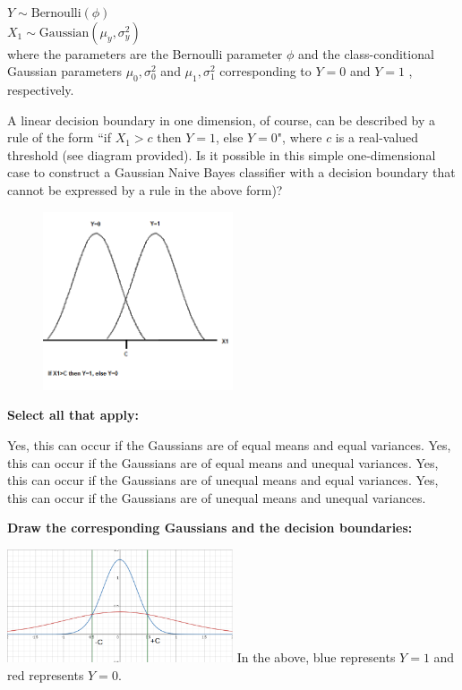 \documentclass[11pt,addpoints,answers]{exam}
\begin{document}
\begin{questions}
    $Y \sim \text{Bernoulli}(\phi)$\\
    $X_1 \sim \text{Gaussian}(\mu_y, \sigma^2_y)$\\
    where the parameters are the Bernoulli parameter $\phi$  and the class-conditional Gaussian parameters $\mu_0, \sigma^2_0$ and $\mu_1, \sigma^2_1$   corresponding to $Y=0$ and $Y=1$ , respectively.

    A linear decision boundary in one dimension, of course, can be described by a rule of the form ``if $X_1>c$  then $Y=1$, else $Y=0$", where $c$ is a real-valued threshold (see diagram provided). Is it possible in this simple one-dimensional case to construct a Gaussian Naive Bayes classifier with a decision boundary that cannot be expressed by a rule in the above form)?

    \begin{figure}[H]
        \centering
        \includegraphics[width=0.5\textwidth]{Gaussians.png}
    \end{figure}
    
    \textbf{Select all that apply:}
    {\checkboxchar{$\Box$} \checkedchar{$\blacksquare$}
    \begin{checkboxes}
        \CorrectChoice Yes, this can occur if the Gaussians are of equal means and equal variances.
        \CorrectChoice Yes, this can occur if the Gaussians are of equal means and unequal variances.
        \choice Yes, this can occur if the Gaussians are of unequal means and equal variances. 
        \CorrectChoice Yes, this can occur if the Gaussians are of unequal means and unequal variances.
    \end{checkboxes}
    }
    
     
    \textbf{Draw the corresponding Gaussians and the decision boundaries: }
    
    
    
    \begin{your_solution}[title=Your answer,height=7cm,width=15cm]
    \vspace{-5pt}
        \includegraphics[width=0.5\textwidth]{graph.png}\newline
        In the above, blue represents $Y=1$ and red represents $Y = 0$.
        

\end{your_solution}
\end{questions}
\end{document}
